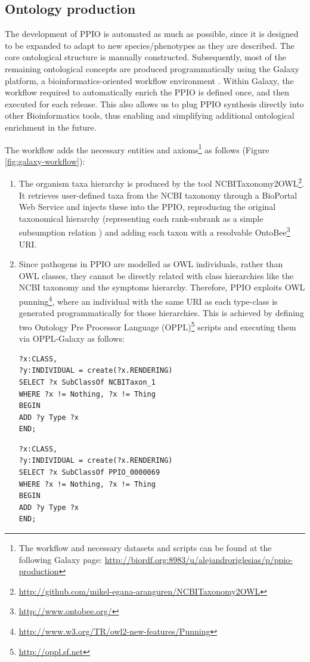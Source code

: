 \documentclass[sw]{iosart2c}
\newcommand{\myurl}[1]{\footnote{\url{#1}}}
\begin{document}
\subsection{Ontology production}
The development of PPIO is automated as much as possible, since it is designed to be expanded to adapt to new species/phenotypes as they are described. The core ontological structure is manually constructed. Subsequently, most of the remaining ontological concepts are produced programmatically using the Galaxy platform, a bioinformatics-oriented workflow environment \cite{galaxy}. Within Galaxy, the workflow required to automatically enrich the PPIO is defined once, and then executed for each release. This also allows us to plug PPIO synthesis directly into other Bioinformatics tools, thus enabling and simplifying additional ontological enrichment in the future.

The workflow adds the necessary entities and axioms\footnote{The workflow and necessary datasets and scripts can be found at the following Galaxy page: \url{http://biordf.org:8983/u/alejandroriglesias/p/ppio-production}} as follows (Figure \ref{fig:galaxy-workflow}):
\begin{enumerate}

\item The organism taxa hierarchy is produced by the tool NCBITaxonomy2OWL\myurl{http://github.com/mikel-egana-aranguren/NCBITaxonomy2OWL}. It retrieves user-defined taxa from the NCBI taxonomy through a BioPortal Web Service \cite{bioportal} and injects these into the PPIO, reproducing the original taxonomical hierarchy (representing each rank-subrank as a simple subsumption relation \cite{taxa_ismb_2008}) and adding each taxon with a resolvable OntoBee\myurl{http://www.ontobee.org/} URI.

\item Since pathogens in PPIO are modelled as OWL individuals, rather than OWL classes, they cannot be directly related with class hierarchies like the NCBI taxonomy and the symptoms hierarchy. Therefore, PPIO exploits OWL punning\myurl{http://www.w3.org/TR/owl2-new-features/Punning}, where an individual with the same URI as each type-class is generated programmatically for those hierarchies. This is achieved by defining two Ontology Pre Processor Language (OPPL)\myurl{http://oppl.sf.net} scripts and executing them via OPPL-Galaxy \cite{OPPL-Galaxy-JBMS} as follows:

{\small 
\begin{verbatim}
?x:CLASS,
?y:INDIVIDUAL = create(?x.RENDERING)
SELECT ?x SubClassOf NCBITaxon_1
WHERE ?x != Nothing, ?x != Thing
BEGIN
ADD ?y Type ?x
END;
\end{verbatim}
}

{\small 
\begin{verbatim}
?x:CLASS,
?y:INDIVIDUAL = create(?x.RENDERING)
SELECT ?x SubClassOf PPIO_0000069
WHERE ?x != Nothing, ?x != Thing
BEGIN
ADD ?y Type ?x
END;
\end{verbatim}
}

\end{enumerate}
\end{document}
